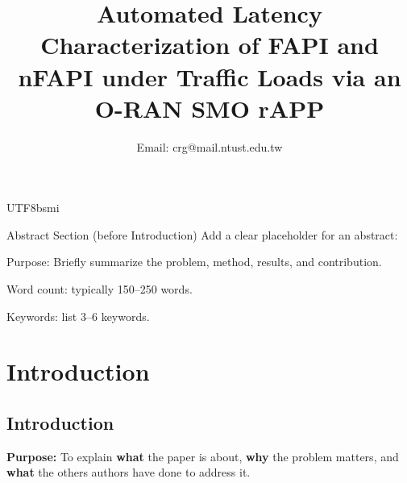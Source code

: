 \documentclass[conference]{IEEEtran}
\begin{document}
\begin{CJK}{UTF8}{bsmi}
\title{Automated Latency Characterization of FAPI and nFAPI under Traffic Loads via an O-RAN SMO rAPP}
\author{
\author{
  Email: crg@mail.ntust.edu.tw
}

}

\maketitle

Abstract Section (before Introduction)
Add a clear placeholder for an abstract:

Purpose: Briefly summarize the problem, method, results, and contribution.

Word count: typically 150–250 words.

Keywords: list 3–6 keywords.

\section{Introduction}
\subsection{Introduction}
{\bf Purpose:} To explain {\bf what} the paper is about, {\bf why} the problem matters, and {\bf what} the others authors have done to address it.


\end{CJK}
\end{document}
